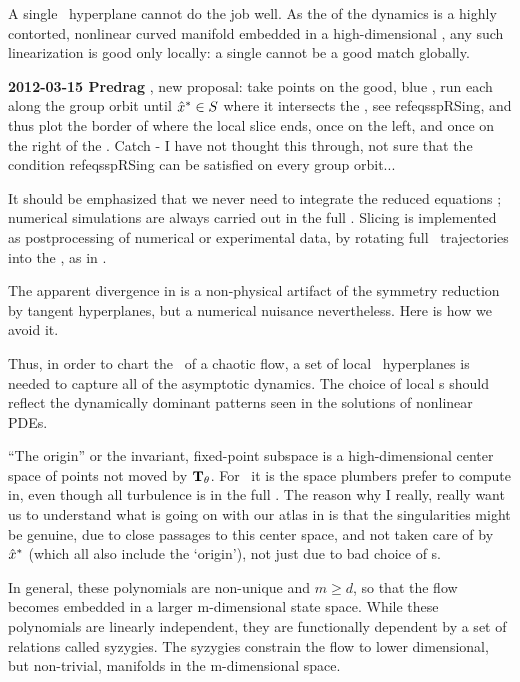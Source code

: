 A single
\slice\ hyperplane cannot do the job well. As the {\nws} of the dynamics is a
highly contorted, nonlinear curved manifold embedded in a
high-dimensional \statesp, any such linearization is good only locally: a
single {\template} cannot be a good match  globally.


    \ifdraft\color{blue}
        {\bf 2012-03-15 Predrag} , new proposal:
        take points on the good, blue \po, run each along the group orbit
        until $\hat{x}^\ast \in S$ where it intersects the \chartBord, see
         refeq{sspRSing}, and thus plot the border of where the local
        slice ends, once on the left, and once on the right of the
        {\template}. Catch - I have not thought this through, not sure
        that the condition  refeq{sspRSing} can be satisfied on every
        group orbit...
    \color{black}\fi

It should be emphasized that we never need to integrate the reduced
equations ; numerical simulations are always carried
out in the full \statesp. Slicing is implemented as postprocessing of
numerical or experimental data, by rotating full \statesp\ trajectories
into the \slice, as in .

The apparent divergence in {\phaseVel}  is a
non-physical artifact of the symmetry reduction by tangent hyperplanes,
but a numerical nuisance nevertheless. Here is how we avoid it.

Thus, in order to chart the \statesp\ of a chaotic flow, a set
of local \slice\ hyperplanes is needed to capture all of the asymptotic
dynamics. The choice of local \slice s should reflect the dynamically
dominant patterns seen in the solutions of nonlinear PDEs.

``The origin'' or the invariant, fixed-point subspace is a
high-dimensional center space of points not moved by $\mathbf{T}_{\theta}$. For
\pCf\ it is the space plumbers prefer to compute in, even though all
turbulence is in the full \statesp. The reason why I really, really want
us to understand what is going on with our atlas in 
is that the singularities might be genuine, due to close passages to this
center space, and not taken care of by $\hat{x}^\ast$ (which all also
include the `origin'), not just due to bad choice of \template s.

In general, these polynomials are non-unique and $m \geq d$, so
that the flow becomes embedded in a larger m-dimensional state space.
While these polynomials are linearly independent, they are functionally
dependent by a set of relations called syzygies. The syzygies constrain
the flow to lower dimensional, but non-trivial, manifolds in the
m-dimensional space.

